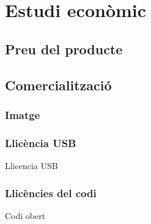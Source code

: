\chapter{Estudi econòmic}

\section{Preu del producte}
\section{Comercialització}
\subsection{Imatge}
\subsection{Llicència USB}
Llicencia USB
\subsection{Llicències del codi}
Codi obert
